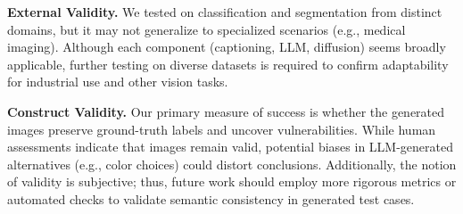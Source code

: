 \noindent\textbf{External Validity.}
We tested \approach on classification and segmentation from distinct domains, but it may not generalize to specialized scenarios (e.g., medical imaging). Although each component (captioning, LLM, diffusion) seems broadly applicable, further testing on diverse datasets is required to confirm adaptability for industrial use and other vision tasks.

\noindent\textbf{Construct Validity.}
Our primary measure of success is whether the generated images preserve ground-truth labels and uncover vulnerabilities. While human assessments indicate that images remain valid, potential biases in LLM-generated alternatives (e.g., color choices) could distort conclusions. Additionally, the notion of validity is subjective; thus, future work should employ more rigorous metrics or automated checks to validate semantic consistency in generated test cases.